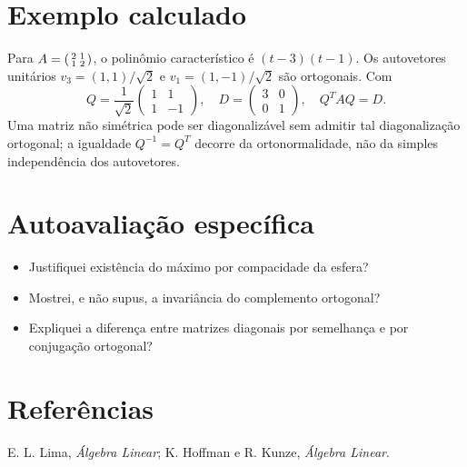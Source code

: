 \documentclass[11pt,a4paper]{article}
\begin{document}
\section{Exemplo calculado}
Para $A=\begin{psmallmatrix}2&1\\1&2\end{psmallmatrix}$, o polinômio característico é $(t-3)(t-1)$. Os autovetores unitários
$v_3=(1,1)/\sqrt2$ e $v_1=(1,-1)/\sqrt2$ são ortogonais. Com
\[
Q=\frac1{\sqrt2}\begin{pmatrix}1&1\\1&-1\end{pmatrix},
\quad D=\begin{pmatrix}3&0\\0&1\end{pmatrix},
\quad Q^TAQ=D.
\]
Uma matriz não simétrica pode ser diagonalizável sem admitir tal diagonalização ortogonal; a igualdade $Q^{-1}=Q^T$ decorre da ortonormalidade, não da simples independência dos autovetores.
\section{Autoavaliação específica}
\begin{itemize}
\item Justifiquei existência do máximo por compacidade da esfera?
\item Mostrei, e não supus, a invariância do complemento ortogonal?
\item Expliquei a diferença entre matrizes diagonais por semelhança e por conjugação ortogonal?
\end{itemize}
\RubricaUFMT
\section{Referências}
E. L. Lima, \emph{Álgebra Linear}; K. Hoffman e R. Kunze, \emph{Álgebra Linear}.
\end{document}

